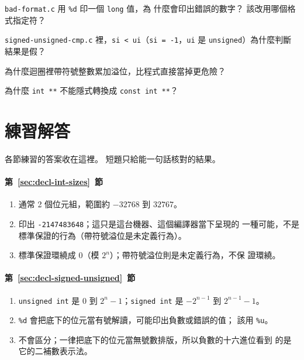 \begin{drills}[label=drills:decl-pitfalls]
\item \texttt{bad-format.c} 用 \texttt{\%d} 印一個 \texttt{long} 值，為
什麼會印出錯誤的數字？ 該改用哪個格式指定符？
\item \texttt{signed-unsigned-cmp.c} 裡，\texttt{si < ui}（\texttt{si =
-1}，\texttt{ui} 是 \texttt{unsigned}）為什麼判斷結果是假？
\item 為什麼迴圈裡帶符號整數累加溢位，比程式直接當掉更危險？
\item 為什麼 \texttt{int **} 不能隱式轉換成 \texttt{const int **}？
\end{drills}

\section*{練習解答}

各節練習的答案收在這裡。 短題只給能一句話核對的結果。

\paragraph{第~\ref{sec:decl-int-sizes}~節}
\begin{enumerate}
\item 通常 2 個位元組，範圍約 $-32768$ 到 $32767$。
\item 印出 \texttt{-2147483648}；這只是這台機器、這個編譯器當下呈現的
一種可能，不是標準保證的行為（帶符號溢位是未定義行為）。
\item 標準保證環繞成 $0$（模 $2^n$）；帶符號溢位則是未定義行為，不保
證環繞。
\end{enumerate}

\paragraph{第~\ref{sec:decl-signed-unsigned}~節}
\begin{enumerate}
\item \texttt{unsigned int} 是 $0$ 到 $2^n - 1$；\texttt{signed int} 是
$-2^{n-1}$ 到 $2^{n-1} - 1$。
\item \texttt{\%d} 會把底下的位元當有號解讀，可能印出負數或錯誤的值；
該用 \texttt{\%u}。
\item 不會區分；一律把底下的位元當無號數排版，所以負數的十六進位看到
的是它的二補數表示法。
\end{enumerate}

